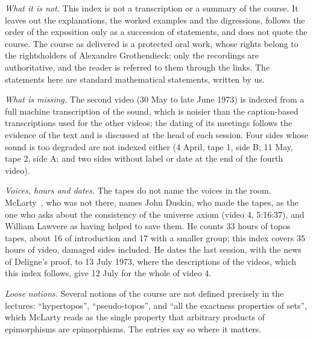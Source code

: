 \documentclass[11pt]{article}
\newcommand{\q}[1]{“#1”}
\begin{document}
\emph{What it is not.} This index is not a transcription or a summary of the course. It leaves out the explanations, the worked examples and the digressions, follows the order of the exposition only as a succession of statements, and does not quote the course. The course as delivered is a protected oral work, whose rights belong to the rightsholders of Alexandre Grothendieck; only the recordings are authoritative, and the reader is referred to them through the links. The statements here are standard mathematical statements, written by us.

\emph{What is missing.} The second video (30 May to late June 1973) is indexed from a full machine transcription of the sound, which is noisier than the caption-based transcriptions used for the other videos; the dating of its meetings follows the evidence of the text and is discussed at the head of each session. Four sides whose sound is too degraded are not indexed either (4 April, tape 1, side B; 11 May, tape 2, side A; and two sides without label or date at the end of the fourth video).

\emph{Voices, hours and dates.} The tapes do not name the voices in the room. McLarty~\cite{mclarty}, who was not there, names John Duskin, who made the tapes, as the one who asks about the consistency of the universe axiom (video 4, 5:16:37), and William Lawvere as having helped to save them. He counts 33 hours of topos tapes, about 16 of introduction and 17 with a smaller group; this index covers 35 hours of video, damaged sides included. He dates the last session, with the news of Deligne's proof, to 13 July 1973, where the descriptions of the videos, which this index follows, give 12 July for the whole of video 4.

\emph{Loose notions.} Several notions of the course are not defined precisely in the lectures: \q{hypertopos}, \q{pseudo-topos}, and \q{all the exactness properties of sets}, which McLarty reads as the single property that arbitrary products of epimorphisms are epimorphisms. The entries say so where it matters.
\end{document}
